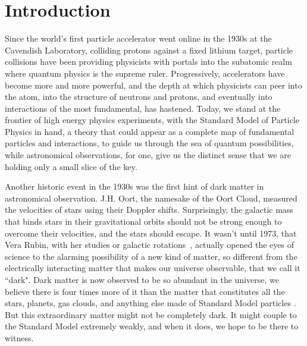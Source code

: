 \chapter{Introduction}

Since the world's first particle accelerator went online in the 1930s at the Cavendish Laboratory, colliding protons against a fixed lithium target, particle collisions have been providing physicists with portals into the subatomic realm where quantum physics is the supreme ruler.  Progressively, accelerators have become more and more powerful, and the depth at which physicists can peer into the atom, into the structure of neutrons and protons, and eventually into interactions of the most fundamental, has hastened.  Today, we stand at the frontier of high energy physics experiments, with the Standard Model of Particle Physics in hand, a theory that could appear as a complete map of fundamental particles and interactions, to guide us through the sea of quantum possibilities, while astronomical observations, for one, give us the distinct sense that we are holding only a small slice of the key.  

Another historic event in the 1930s was the first hint of dark matter in astronomical observation.  J.H. Oort, the namesake of the Oort Cloud, measured the velocities of stars using their Doppler shifts.  Surprisingly, the galactic mass that binds stars in their gravitational orbits should not be strong enough to overcome their velocities, and the stars should escape.  It wasn't until 1973, that Vera Rubin, with her studies or galactic rotations~\cite{rubin1973, rubin1983}, actually opened the eyes of science to the alarming possibility of a new kind of matter, so different from the electrically interacting matter that makes our universe observable, that we call it ``dark".  Dark matter is now observed to be so abundant in the universe, we believe there is four times more of it than the matter that constitutes all the stars, planets, gas clouds, and anything else made of Standard Model particles \cite{Garrett:2010hd}.  But this extraordinary matter might not be completely dark.  It might couple to the Standard Model extremely weakly, and when it does, we hope to be there to witness.

